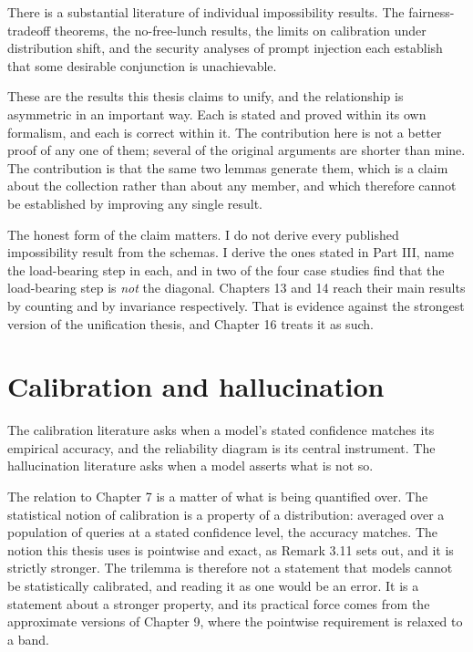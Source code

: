 \documentclass{memoir}
\begin{document}
There is a substantial literature of individual impossibility results. The
fairness-tradeoff theorems, the no-free-lunch results, the limits on calibration
under distribution shift, and the security analyses of prompt injection each
establish that some desirable conjunction is unachievable.

These are the results this thesis claims to unify, and the relationship is
asymmetric in an important way. Each is stated and proved within its own
formalism, and each is correct within it. The contribution here is not a better
proof of any one of them; several of the original arguments are shorter than
mine. The contribution is that the same two lemmas generate them, which is a
claim about the collection rather than about any member, and which therefore
cannot be established by improving any single result.

The honest form of the claim matters. I do not derive every published
impossibility result from the schemas. I derive the ones stated in Part III,
name the load-bearing step in each, and in two of the four case studies find
that the load-bearing step is \emph{not} the diagonal. Chapters 13 and 14 reach their
main results by counting and by invariance respectively. That is evidence
against the strongest version of the unification thesis, and Chapter 16 treats
it as such.



\section{Calibration and hallucination}\label{Two--Schemas--of--Impossibility-005F-005F-005F--Machine--Checked--Limits--of--Trustworthy--Machine--Learning-005F-005F-005F--and--Why--They--Tighten--with--Capability----Related--Work--and--Positioning----Calibration--and--hallucination}

The calibration literature asks when a model's stated confidence matches its
empirical accuracy, and the reliability diagram is its central instrument. The
hallucination literature asks when a model asserts what is not so.

The relation to Chapter 7 is a matter of what is being quantified over. The
statistical notion of calibration is a property of a distribution: averaged over
a population of queries at a stated confidence level, the accuracy matches. The
notion this thesis uses is pointwise and exact, as Remark 3.11 sets out, and it
is strictly stronger. The trilemma is therefore not a statement that models
cannot be statistically calibrated, and reading it as one would be an error. It
is a statement about a stronger property, and its practical force comes from the
approximate versions of Chapter 9, where the pointwise requirement is relaxed to
a band.
\end{document}
